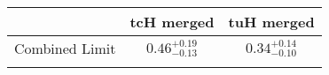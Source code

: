 \centering
\begin{tabular}{ccc} \toprule\toprule
 & tcH merged & tuH merged\\\midrule
Combined Limit & $0.46^{+0.19}_{-0.13}$ & $0.34^{+0.14}_{-0.10}$\\
\bottomrule\bottomrule\\
\end{tabular}